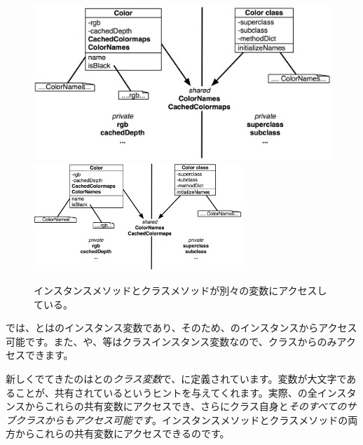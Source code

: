 \documentclass[a4paper,10pt,twoside]{book}
\begin{document}
\begin{figure}[htb]
\begin{center}
\ifluluelse
	{\includegraphics[width=\textwidth]{privateSharedVarColor}}
	{\includegraphics[width=0.7\textwidth]{privateSharedVarColor}}
\caption{インスタンスメソッドとクラスメソッドが別々の変数にアクセスしている。}
\end{center}
\end{figure}

では、とはのインスタンス変数であり、そのため、のインスタンスからアクセス可能です。また、や、等はクラスインスタンス変数なので、クラスからのみアクセスできます。

新しくでてきたのはとの\emph{クラス変数}で、に定義されています。変数が大文字であることが、共有されているというヒントを与えてくれます。実際、の全インスタンスからこれらの共有変数にアクセスでき、さらにクラス自身と\emph{そのすべてのサブクラスからもアクセス可能です}。インスタンスメソッドとクラスメソッドの両方からこれらの共有変数にアクセスできるのです。

\end{document}
